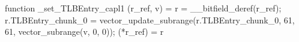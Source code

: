 function _set_TLBEntry_capl1 (r_ref, v) = {
    r = __bitfield_deref(r_ref);
    r.TLBEntry_chunk_0 = vector_update_subrange(r.TLBEntry_chunk_0, 61, 61, vector_subrange(v, 0, 0));
    (*r_ref) = r
}
